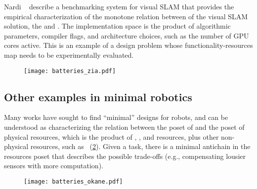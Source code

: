 \begin{figure}[h]
  \begin{center}
  \end{center}
  \caption{\label{fig:progressive-1-1}}
\end{figure}


\begin{example}
  Nardi\,\,\etal~\cite{zia16comparative} describe a benchmarking
  system for visual SLAM that provides the empirical characterization
  of the monotone relation between  of the visual
  SLAM solution, the  and . The implementation space is the product
  of algorithmic parameters, compiler flags, and architecture choices,
  such as the number of GPU cores active. This is an example of a design
  problem whose functionality-resources map needs to be experimentally
  evaluated.
\end{example}

\begin{figure}[h]
  \centering
  \texttt{[image: batteries\_zia.pdf]}
  \caption{}
\end{figure}


\subsection{Other examples in minimal robotics}

Many works have sought to find ``minimal'' designs for robots, and
can be understood as characterizing the relation between the poset
of  and the poset of physical resources, which is the product
of , , and  resources,
plus other non-physical resources, such as ~(\cref{fig:robot-generic}).
Given a task, there is a minimal antichain in the resources poset
that describes the possible trade-offs (e.g., compensating lousier
sensors with more computation).

\begin{figure}
  \centering
  \texttt{[image: batteries\_okane.pdf]}
  \caption{\label{fig:robot-generic}}
\end{figure}


